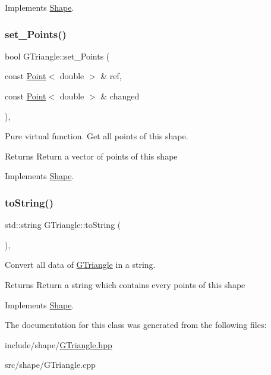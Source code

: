 Implements \hyperlink{classShape_a2dea8616fd40f2d69fd208715921982a}{Shape}.

\mbox{\label{classGTriangle_adb9dae329128600209c54cc4587480ee}} 
\subsubsection{\texorpdfstring{set\+\_\+\+Points()}{set\_Points()}}
{\footnotesize\ttfamily bool G\+Triangle\+::set\+\_\+\+Points (\begin{DoxyParamCaption}\item[{const \hyperlink{classPoint}{Point}$<$ double $>$ \&}]{ref,  }\item[{const \hyperlink{classPoint}{Point}$<$ double $>$ \&}]{changed }\end{DoxyParamCaption})\hspace{0.3cm}{\ttfamily [override]}, {\ttfamily [virtual]}}



Pure virtual function. Get all points of this shape. 

\begin{DoxyReturn}{Returns}
Return a vector of points of this shape 
\end{DoxyReturn}


Implements \hyperlink{classShape_a6eb0d80cccc44cb72b06c61d9780bc6b}{Shape}.

\mbox{\label{classGTriangle_a8381aeea39fac0d52ad9e0d45b791b3b}} 
\subsubsection{\texorpdfstring{to\+String()}{toString()}}
{\footnotesize\ttfamily std\+::string G\+Triangle\+::to\+String (\begin{DoxyParamCaption}{ }\end{DoxyParamCaption})\hspace{0.3cm}{\ttfamily [override]}, {\ttfamily [virtual]}}



Convert all data of \hyperlink{classGTriangle}{G\+Triangle} in a string. 

\begin{DoxyReturn}{Returns}
Return a string which contains every points of this shape 
\end{DoxyReturn}


Implements \hyperlink{classShape_a98fa87c6dc4c7045fd6897a8f3bc186c}{Shape}.



The documentation for this class was generated from the following files\+:\begin{DoxyCompactItemize}
\item 
include/shape/\hyperlink{GTriangle_8hpp}{G\+Triangle.\+hpp}\item 
src/shape/G\+Triangle.\+cpp\end{DoxyCompactItemize}
